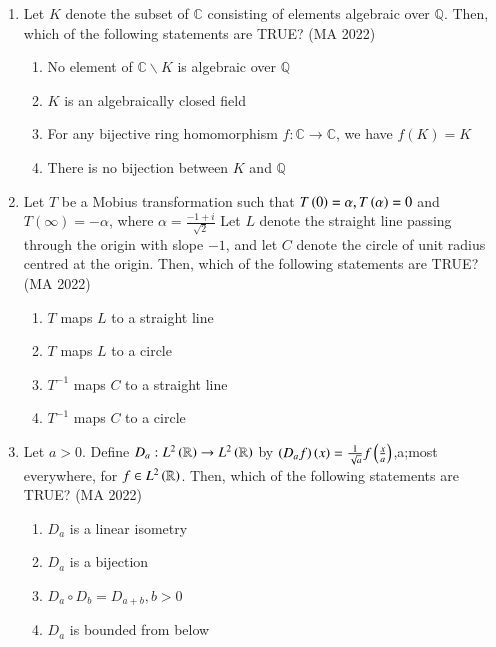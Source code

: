 \documentclass[journal,12pt,onecolumn]{IEEEtran}
\theoremstyle{remark}
\begin{document}
\begin{enumerate}
\begin{multicols}{4}
\begin{enumerate}
\item $\alpha < 3$
\item $3 \leq \alpha < 5.5$
\item $5.5 \leq \alpha < 7$
\item $\alpha \geq 7$
\end{enumerate}
\end{multicols}
\item Let $K$ denote the subset of $\mathbb{C}$ consisting of elements algebraic over $\mathbb{Q}$. Then, which
of the following statements are TRUE?
\hfill{(MA 2022)}
\begin{enumerate}
\item No element of $\mathbb{C}\backslash K$ is algebraic over $\mathbb{Q}$
\item $K$ is an algebraically closed field
\item For any bijective ring homomorphism $f : \mathbb{C} \rightarrow \mathbb{C} $, we have $f(K)=K$
\item There is no bijection between $K$ and $\mathbb{Q}$
\end{enumerate}
\item Let $T$ be a Mobius transformation such that $T\left(0\right)=\alpha,T\left(\alpha\right)=0$ and $T(\infty)=-\alpha $, where $\alpha = \frac{-1+i}{\sqrt{2}}$ Let $L$ denote the straight line passing through the origin with slope  $-1$, and let $C$ denote the circle of unit radius centred at the origin. Then, which of the following statements are TRUE?
\hfill{(MA 2022)}
\begin{enumerate}
\item $T$ maps $L$ to a straight line
\item $T$ maps $L$ to a circle
\item $T^{-1}$ maps $C$ to a straight line
\item $T^{-1}$ maps $C$ to a circle
\end{enumerate}
\item Let $a>0$. Define $D_a : L^2\left(\mathbb{R}\right) \rightarrow L^2\left(\mathbb{R}\right)$ by $\left(D_af\right)\left(x\right)=\frac{1}{\sqrt{a}}f\left(\frac{x}{a}\right)$,a;most everywhere, for $f \in L^2\left(\mathbb{R}\right)$. Then, which of the following statements are TRUE?
\hfill{(MA 2022)}
\begin{enumerate}
\item $D_a$ is a linear isometry
\item $D_a$ is a bijection
\item $D_a \circ D_b=D_{a+b},b>0$
\item $D_a$ is bounded from below

\end{enumerate}
\end{enumerate}
\end{document}
